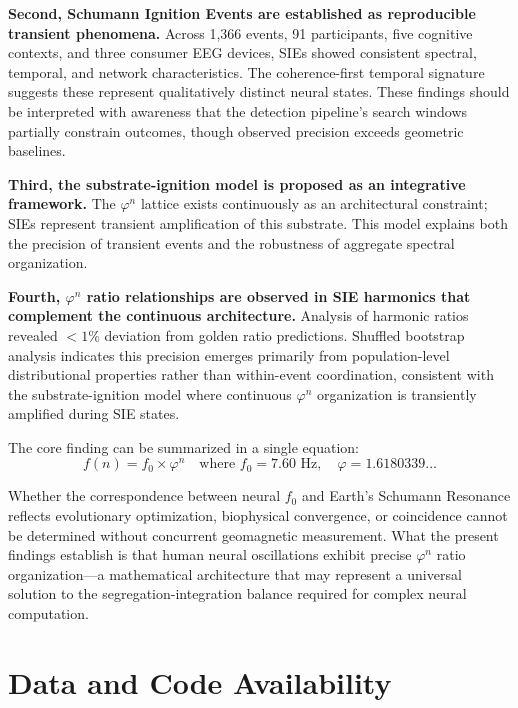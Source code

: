 \documentclass[11pt,a4paper]{article}
\newcommand{\phisym}{\varphi}
\begin{document}
\textbf{Second, Schumann Ignition Events are established as reproducible transient phenomena.} Across 1,366 events, 91 participants, five cognitive contexts, and three consumer EEG devices, SIEs showed consistent spectral, temporal, and network characteristics. The coherence-first temporal signature suggests these represent qualitatively distinct neural states. These findings should be interpreted with awareness that the detection pipeline's search windows partially constrain outcomes, though observed precision exceeds geometric baselines.

\textbf{Third, the substrate-ignition model is proposed as an integrative framework.} The $\phisym^n$ lattice exists continuously as an architectural constraint; SIEs represent transient amplification of this substrate. This model explains both the precision of transient events and the robustness of aggregate spectral organization.

\textbf{Fourth, $\phisym^n$ ratio relationships are observed in SIE harmonics that complement the continuous architecture.} Analysis of harmonic ratios revealed $<1\%$ deviation from golden ratio predictions. Shuffled bootstrap analysis indicates this precision emerges primarily from population-level distributional properties rather than within-event coordination, consistent with the substrate-ignition model where continuous $\phisym^n$ organization is transiently amplified during SIE states.

The core finding can be summarized in a single equation:
\begin{equation}
f(n) = f_0 \times \phisym^n \quad \text{where } f_0 = 7.60 \text{ Hz}, \quad \phisym = 1.6180339...
\end{equation}

Whether the correspondence between neural $f_0$ and Earth's Schumann Resonance reflects evolutionary optimization, biophysical convergence, or coincidence cannot be determined without concurrent geomagnetic measurement. What the present findings establish is that human neural oscillations exhibit precise $\phisym^n$ ratio organization---a mathematical architecture that may represent a universal solution to the segregation-integration balance required for complex neural computation.

\section*{Data and Code Availability}
\end{document}
